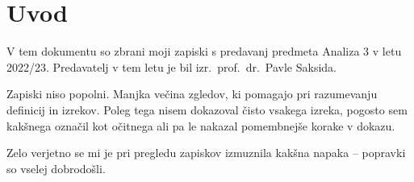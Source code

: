 \section*{Uvod}

V tem dokumentu so zbrani moji zapiski s predavanj predmeta
Analiza 3 v letu 2022/23. Predavatelj v tem letu je bil
izr.~prof.~dr.~Pavle Saksida.

Zapiski niso popolni. Manjka večina zgledov, ki pomagajo pri razumevanju definicij in izrekov. Poleg tega nisem dokazoval čisto vsakega izreka, pogosto sem kakšnega označil kot očitnega ali pa le nakazal pomembnejše korake v dokazu.

Zelo verjetno se mi je pri pregledu zapiskov izmuznila kakšna napaka -- popravki so vselej dobrodošli.